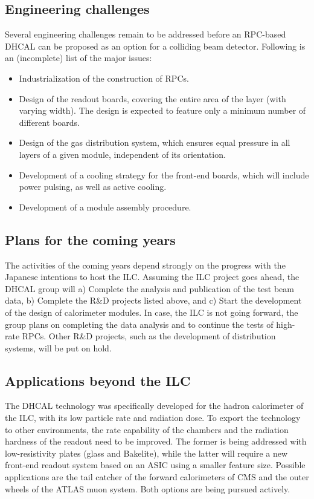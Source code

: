 \subsection{Engineering challenges}
Several engineering challenges remain to be addressed before an RPC-based DHCAL can be proposed as an option for a colliding beam detector. Following is an (incomplete) list of the major issues:
\begin{itemize}
\item Industrialization of the construction of RPCs.
\item Design of the readout boards, covering the entire area of the layer (with varying width). The design is expected to feature only a minimum number of different boards.
\item Design of the gas distribution system, which ensures equal pressure in all layers of a given module, independent of its orientation.
\item Development of a cooling strategy for the front-end boards, which will include power pulsing, as well as active cooling.
\item Development of a module assembly procedure.
\end{itemize}

\subsection{Plans for the coming years}
The activities of the coming years depend strongly on the progress with the Japanese intentions to host the ILC. Assuming the ILC project goes ahead, the DHCAL group will
a)  Complete the analysis and publication of the test beam data,
b)  Complete the R\&D projects listed above, and
c)  Start the development of the design of calorimeter modules.
In case, the ILC is not going forward, the group plans on completing the data analysis and to continue the tests of high-rate RPCs. Other R\&D projects, such as the development of distribution systems, will be put on hold.

\subsection{Applications beyond the ILC}
The DHCAL technology was specifically developed for the hadron calorimeter of the ILC, with its low particle rate and radiation dose. To export the technology to other environments, the rate capability of the chambers and the radiation hardness of the readout need to be improved. The former is being addressed with low-resistivity plates (glass and Bakelite), while the latter will require a new front-end readout system based on an ASIC using a smaller feature size. Possible applications are the tail catcher of the forward calorimeters of CMS and the outer wheels of the ATLAS muon system. Both options are being pursued actively.


